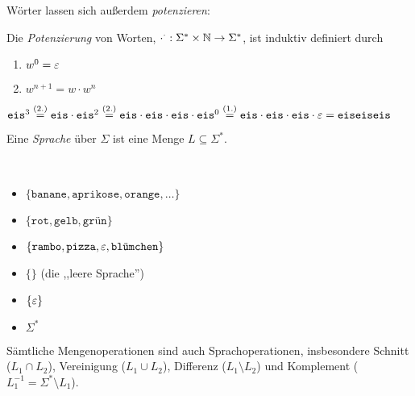 Wörter lassen sich außerdem \emph{potenzieren}:
\begin{Def}
  Die \emph{Potenzierung} von Worten, $\cdot ^ \cdot: \Sigma^*\times \mathbb{N} \to \Sigma^*$, ist induktiv definiert durch
  \begin{enumerate}
  \item $w^0 = \varepsilon$ 
  \item $w^{n+1} = w \cdot w^n$
  \end{enumerate}
\end{Def}
\begin{Bsp*} $\mathtt{eis}^3 
\stackrel{(2.)}{=} \mathtt{eis}\cdot\mathtt{eis}^2 
\stackrel{(2.)}{=} \mathtt{eis}\cdot\mathtt{eis}\cdot\mathtt{eis}\cdot\mathtt{eis}^0
\stackrel{(1.)}{=} \mathtt{eis}\cdot\mathtt{eis}\cdot\mathtt{eis}\cdot\varepsilon
= \mathtt{eiseiseis}
$
\end{Bsp*}

\begin{Def}[name={[Sprache über $\Sigma$]}]
	Eine \emph{Sprache} über $\Sigma$ ist eine Menge $L\subseteq\Sigma^*$.
\end{Def}
\begin{Bsp*}~ 
  \begin{itemize}
  \item 
	$\{\mathtt{banane}, \mathtt{aprikose},\mathtt{orange},\dots\}$
  \item
    $\{\mathtt{rot},\mathtt{gelb},\texttt{grün}\}$
  \item
    $\{\mathtt{rambo}, \mathtt{pizza}, \varepsilon, \texttt{blümchen}\}$
  \item $\{\}$ (die ,,leere Sprache'')
  \item $\{ \varepsilon \}$
  \item $\Sigma^*$
  \end{itemize}
\end{Bsp*}
Sämtliche Mengenoperationen sind auch Sprachoperationen, insbesondere Schnitt ($L_1 \cap L_2$), Vereinigung ($L_1 \cup L_2$), Differenz ($L_1 \setminus L_2$) und Komplement ($L_1^{-1} = \Sigma^* \setminus L_1$).

